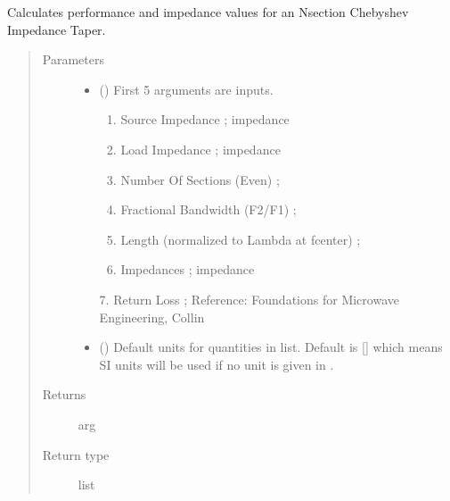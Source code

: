 \documentclass[letterpaper,10pt,english]{sphinxmanual}
\begin{document}

\begin{fulllineitems}
\label{\detokenize{components:components.Chebyshev_Taper_Impedance_Transformer}}
Calculates performance and impedance values for an N\sphinxhyphen{}section Chebyshev Impedance Taper.
\begin{quote}\begin{description}
\item[{Parameters}] \leavevmode\begin{itemize}
\item {} 
 () \textendash{} 
First 5 arguments are inputs.
\begin{enumerate}
%
\item {} 
Source Impedance ; impedance

\item {} 
Load Impedance ; impedance

\item {} 
Number Of Sections (Even) ;

\item {} 
Fractional Bandwidth (F2/F1) ;

\item {} 
Length (normalized to Lambda at fcenter) ;

\item {} 
Impedances ; impedance

\end{enumerate}

7.  Return Loss ;
Reference:  Foundations for Microwave Engineering, Collin


\item {} 
 (\sphinxstyleliteralemphasis{\sphinxupquote{, }}) \textendash{} Default units for quantities in  list. Default is {[}{]} which means SI units will be used if no unit is given in .

\end{itemize}

\item[{Returns}] \leavevmode
arg

\item[{Return type}] \leavevmode
list

\end{description}\end{quote}

\end{fulllineitems}
\end{document}
